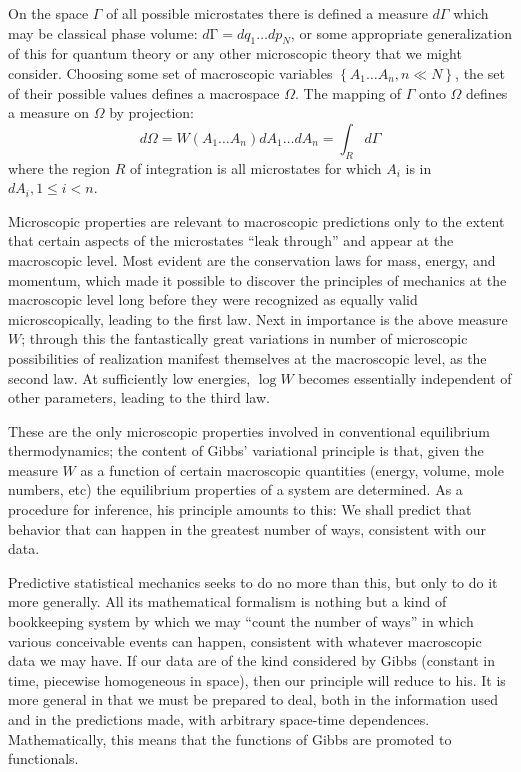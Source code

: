 \documentclass{article}
\begin{document}
On the space $\Gamma$ of all possible microstates there is defined a measure $d \Gamma$ which may be classical phase volume: $d \mathrm{\Gamma}=d q_1 \ldots d p_N$, or some appropriate generalization of this for quantum theory or any other microscopic theory that we might consider. Choosing some set of macroscopic variables $\left\{A_1 \ldots A_n, n \ll N\right\}$, the set of their possible values defines a macrospace $\Omega$. The mapping of $\Gamma$ onto $\Omega$ defines a measure on $\Omega$ by projection:
$$
d \Omega=W\left(A_1 \ldots A_n\right) d A_1 \ldots d A_n=\int_R d \Gamma
$$
where the region $R$ of integration is all microstates for which $A_i$ is in $d A_i, 1 \leqslant i<n$.

Microscopic properties are relevant to macroscopic predictions only to the extent that certain aspects of the microstates ``leak through'' and appear at the macroscopic level. Most evident are the conservation laws for mass, energy, and momentum, which made it possible to discover the principles of mechanics at the macroscopic level long before they were recognized as equally valid microscopically, leading to the first law. Next in importance is the above measure $W$; through this the fantastically great variations in number of microscopic possibilities of realization manifest themselves at the macroscopic level, as the second law. At sufficiently low energies, $\log W$ becomes essentially independent of other parameters, leading to the third law.

These are the only microscopic properties involved in conventional equilibrium thermodynamics; the content of Gibbs' variational principle is that, given the measure $W$ as a function of certain macroscopic quantities (energy, volume, mole numbers, etc) the equilibrium properties of a system are determined. As a procedure for inference, his principle amounts to this: We shall predict that behavior that can happen in the greatest number of ways, consistent with our data.

Predictive statistical mechanics seeks to do no more than this, but only to do it more generally. All its mathematical formalism is nothing but a kind of bookkeeping system by which we may ``count the number of ways'' in which various conceivable events can happen, consistent with whatever macroscopic data we may have. If our data are of the kind considered by Gibbs (constant in time, piecewise homogeneous in space), then our principle will reduce to his. It is more general in that we must be prepared to deal, both in the information used and in the predictions made, with arbitrary space-time dependences. Mathematically, this means that the functions of Gibbs are promoted to functionals.
\end{document}
